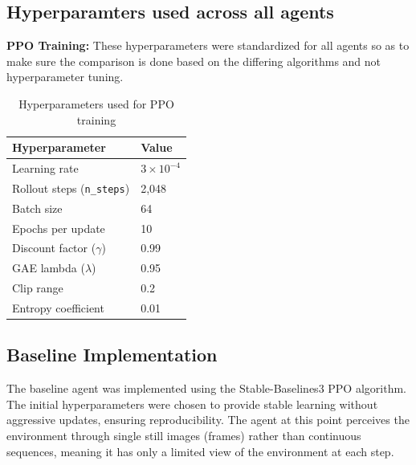 \documentclass[twocolumn]{article}
\begin{document}
\subsection*{Hyperparamters used across all agents}
\textbf{PPO Training:} These hyperparameters were standardized for all agents so as to make sure the comparison is done based on the differing algorithms and not hyperparameter tuning.
\begin{table}[H]
\centering
\caption{Hyperparameters used for PPO training}
\begin{tabular}{@{}ll@{}}
\toprule
\textbf{Hyperparameter} & \textbf{Value} \\ \midrule
Learning rate & $3 \times 10^{-4}$ \\
Rollout steps (\texttt{n\_steps}) & 2,048 \\
Batch size & 64 \\
Epochs per update & 10 \\
Discount factor ($\gamma$) & 0.99 \\
GAE lambda ($\lambda$) & 0.95 \\
Clip range & 0.2 \\
Entropy coefficient & 0.01 \\ \bottomrule
\end{tabular}
\end{table}

\subsection*{Baseline Implementation}
The baseline agent was implemented using the Stable-Baselines3 PPO algorithm. The initial hyperparameters were chosen to provide stable learning without aggressive updates, ensuring reproducibility. The agent at this point perceives the environment through single still images (frames) rather than continuous sequences, meaning it has only a limited view of the environment at each step.
\end{document}
